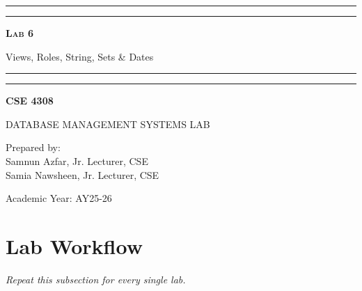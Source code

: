 \documentclass[12pt,a4paper]{article}
\newcommand{\labNo}{Lab 6}
\newcommand{\labTopic}{Views, Roles, String, Sets \& Dates}
\newcommand{\courseCode}{CSE 4308}
\newcommand{\courseTitleLong}{DATABASE MANAGEMENT SYSTEMS LAB}
\newcommand{\instructorName}{Samnun Azfar, Jr. Lecturer, CSE\\ Samia Nawsheen, Jr. Lecturer, CSE}
\newcommand{\academicYear}{AY25-26}
\begin{document}
\begin{titlepage}
    \centering
    \vspace*{2\baselineskip}

    \rule{14cm}{2pt}\vspace*{-0.8\baselineskip}\vspace*{1.5pt}
    \rule{14cm}{0.5pt}\vspace{2\baselineskip}

    {\Huge\bfseries\scshape \labNo\par} 
    \vspace{3mm}
    {\Large \labTopic} 
    \vspace{3mm}

    \rule{14cm}{0.5pt}\vspace*{-0.7\baselineskip}\vspace{2.5pt}
    \rule{14cm}{2pt}

    \vspace{2\baselineskip}

    {\Large\bfseries \courseCode\par} 
    \vspace{1\baselineskip}
    {\large \courseTitleLong\par} 

    \vfill
    {\normalsize Prepared by:\\ \instructorName\par} 
    {\normalsize Academic Year: \academicYear\par} 
\end{titlepage}

\newpage
\tableofcontents
\newpage
\section*{Lab Workflow}



\textit{Repeat this subsection for every single lab.}
\end{document}
